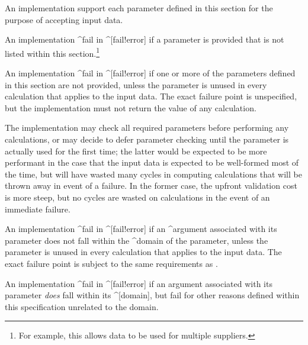 
\label{s:params}

An implementation \shall support each parameter defined in this section for the
purpose of accepting input data.

An implementation \shallnot ^fail in ^[fail!error] if a parameter is provided
that is not listed within this section.\footnote{For example, this allows data
to be used for multiple suppliers.}

 An implementation \must ^fail in ^[fail!error] if one or more of
the parameters defined in this section are not provided, unless the parameter is
unused in every calculation that applies to the input data. The exact failure
point is unspecified, but the implementation must not return the value of any
calculation.

\begin{ex}
The implementation may check all required parameters before performing any
calculations, or may decide to defer parameter checking until the parameter is
actually used for the first time; the latter would be expected to be more
performant in the case that the input data is expected to be well-formed most of
the time, but will have wasted many cycles in computing calculations that will
be thrown away in event of a failure. In the former case, the upfront validation
cost is more steep, but no cycles are wasted on calculations in the event of an
immediate failure.
\end{ex}

An implementation \must ^fail in ^[fail!error] if an ^argument associated with
its parameter does not fall within the ^domain of the parameter, unless the
parameter is unused in every calculation that applies to the input data. The
exact failure point is subject to the same requirements as .

An implementation \mustnot ^fail in ^[fail!error] if an argument associated with
its parameter \emph{does} fall within its ^[domain], but \may fail for other
reasons defined within this specification unrelated to the domain.



